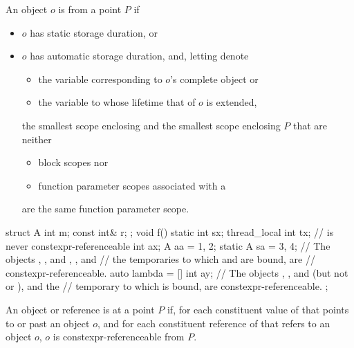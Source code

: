 \documentclass{wg21}
\begin{document}
\begin{addedblock}
An object $o$ is  from a point $P$ if
\begin{itemize}
\item $o$ has static storage duration, or
\item $o$ has automatic storage duration, and, letting  denote
\begin{itemize}
    \item the variable corresponding to $o$’s complete object or
    \item the variable to whose lifetime that of $o$ is extended,
\end{itemize}
the smallest scope enclosing  and the smallest scope enclosing $P$ that
are neither
\begin{itemize}
    \item block scopes nor
    \item function parameter scopes associated with a
\end{itemize}
are the same function parameter scope.
\end{itemize}
\begin{example}
\begin{codeblock}
struct A {
    int m;
    const int& r;
};
void f() {
    static int sx;
    thread_local int tx;  //  is never constexpr-referenceable
    int ax;
    A aa = {1, 2};
    static A sa = {3, 4};
    // The objects , , and , , and
    // the temporaries to which  and  are bound, are
    // constexpr-referenceable.
    auto lambda = [] {
        int ay;
        // The objects , , and  (but not  or ), and the
        // temporary to which  is bound, are constexpr-referenceable.
    };
}
\end{codeblock}
\end{example}
\end{addedblock}


\begin{addedblock}
An object or reference  is  at a point $P$ if, for each constituent value
of  that points to or past an object $o$, and for each constituent reference of  that refers to an
object $o$, $o$ is constexpr-referenceable from $P$.
\end{addedblock}
\end{document}
